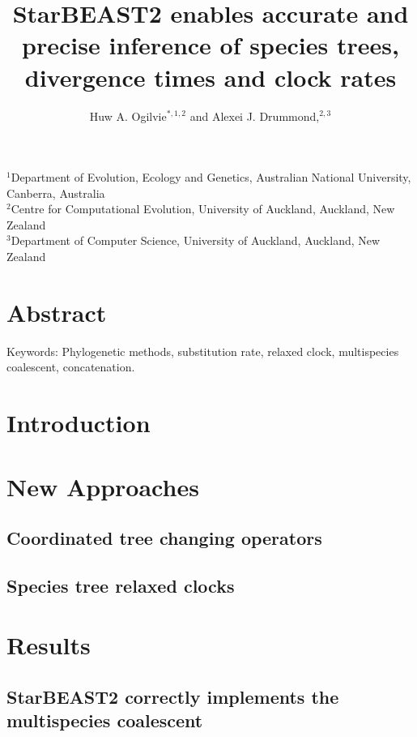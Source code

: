 \documentclass[12pt]{article}
\begin{document}
\begin{minipage}[h]{\textwidth}
	\title{StarBEAST2 enables accurate and precise inference of species trees, divergence times and clock rates}
	\author{Huw A. Ogilvie$^{\ast,1,2}$ and Alexei J. Drummond,$^{2,3}$}
    \maketitle
\end{minipage}

\raggedright
$^{1}$Department of Evolution, Ecology and Genetics, Australian National University, Canberra, Australia\\
$^{2}$Centre for Computational Evolution, University of Auckland, Auckland, New Zealand\\
$^{3}$Department of Computer Science, University of Auckland, Auckland, New Zealand

\clearpage

\justifying

\section{Abstract}

Keywords: Phylogenetic methods, substitution rate, relaxed clock, multispecies coalescent, concatenation.

\section{Introduction}


\section{New Approaches}

\subsection{Coordinated tree changing operators}

\subsection{Species tree relaxed clocks}

\section{Results}

\subsection{StarBEAST2 correctly implements the multispecies coalescent}
\end{document}
